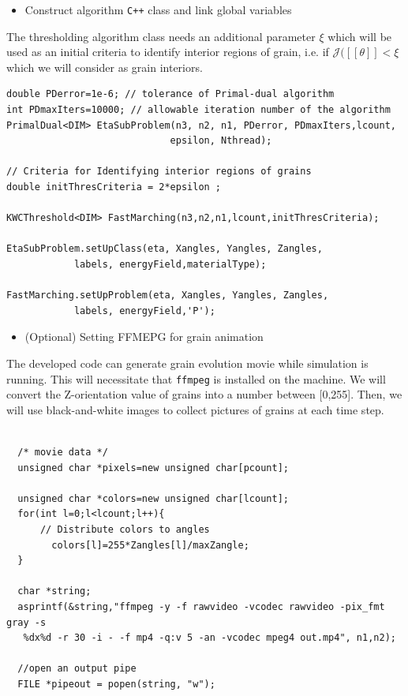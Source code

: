 \documentclass[11pt]{article}
\begin{document}
\begin{itemize} \item Construct algorithm \texttt{C++} class
and link global variables \end{itemize}

The thresholding algorithm class needs an additional parameter
$\xi$ which will be used as an initial criteria to identify interior regions of grain,
i.e. if $\mathcal{J}\big( [\![ \theta ]\!] < \xi$ which  we will consider as 
grain interiors. \\

\begin{tcolorbox}
\begin{lstlisting}[basicstyle=\footnotesize]
double PDerror=1e-6; // tolerance of Primal-dual algorithm
int PDmaxIters=10000; // allowable iteration number of the algorithm
PrimalDual<DIM> EtaSubProblem(n3, n2, n1, PDerror, PDmaxIters,lcount,
						     epsilon, Nthread);

// Criteria for Identifying interior regions of grains
double initThresCriteria = 2*epsilon ; 

KWCThreshold<DIM> FastMarching(n3,n2,n1,lcount,initThresCriteria);

EtaSubProblem.setUpClass(eta, Xangles, Yangles, Zangles, 
			labels, energyField,materialType);
			
FastMarching.setUpProblem(eta, Xangles, Yangles, Zangles, 
			labels, energyField,'P');  
\end{lstlisting}
\end{tcolorbox}

\begin{itemize} \item (Optional) Setting FFMEPG for grain animation \end{itemize}

The developed code can generate grain evolution movie while simulation is running.
This will necessitate that \texttt{ffmpeg} is installed on the machine. 
We will convert the Z-orientation value of grains into a number between 
[0,255]. Then, we will use black-and-white images to collect pictures of grains 
at each time step. \\

\begin{tcolorbox}
\begin{lstlisting}[basicstyle=\footnotesize]
  
  /* movie data */
  unsigned char *pixels=new unsigned char[pcount];
  
  unsigned char *colors=new unsigned char[lcount];
  for(int l=0;l<lcount;l++){
      // Distribute colors to angles
        colors[l]=255*Zangles[l]/maxZangle;
  }
  
  char *string;
  asprintf(&string,"ffmpeg -y -f rawvideo -vcodec rawvideo -pix_fmt gray -s 
   %dx%d -r 30 -i - -f mp4 -q:v 5 -an -vcodec mpeg4 out.mp4", n1,n2);
  
  //open an output pipe
  FILE *pipeout = popen(string, "w");
  
\end{lstlisting}
\end{tcolorbox}
\end{document}
